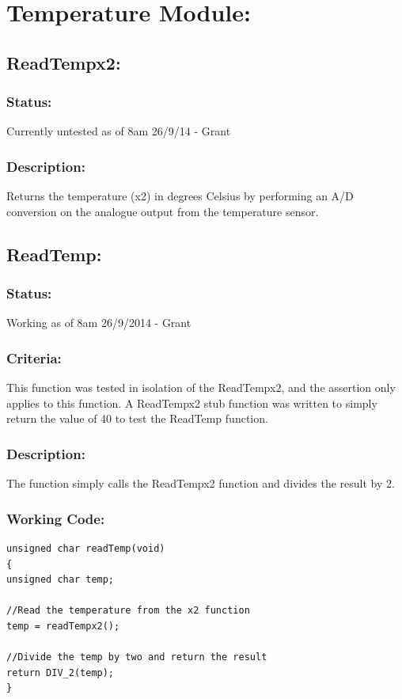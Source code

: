 \documentclass[]{report}
\begin{document}
\newpage
\section{Temperature Module:}

\subsection{ReadTempx2:}

\subsubsection{Status:}
Currently untested as of 8am 26/9/14 - Grant

\subsubsection{Description:}
Returns the temperature (x2) in degrees Celsius by performing an A/D conversion on the analogue output from the temperature sensor.

\subsection{ReadTemp:}
\subsubsection{Status:}
Working as of 8am 26/9/2014 - Grant

\subsubsection{Criteria:}
This function was tested in isolation of the ReadTempx2, and the assertion only applies to this function. A ReadTempx2 stub function was written to simply return the value of 40 to test the ReadTemp function.

\subsubsection{Description:}
The function simply calls the ReadTempx2 function and divides the result by 2.

\subsubsection{Working Code:}
\begin{lstlisting}
unsigned char readTemp(void)
{
unsigned char temp;

//Read the temperature from the x2 function
temp = readTempx2();

//Divide the temp by two and return the result
return DIV_2(temp);
}
\end{lstlisting}
\end{document}
